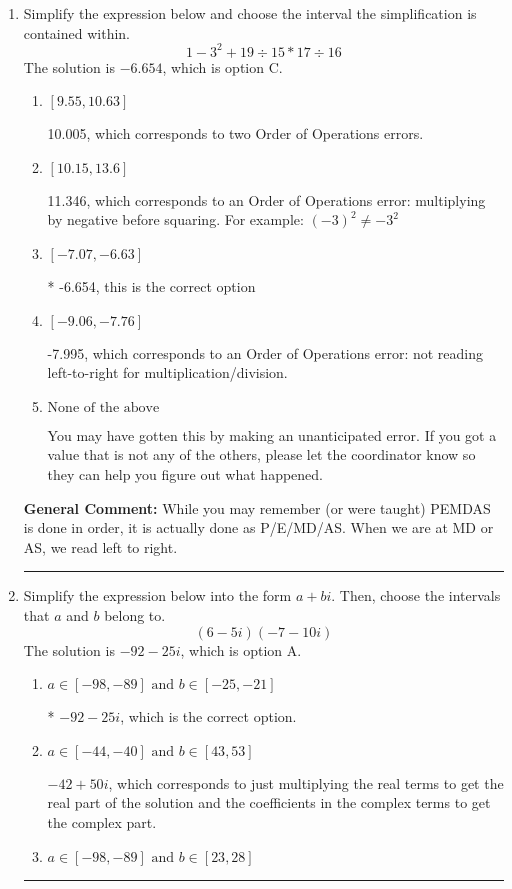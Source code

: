\documentclass{extbook}[14pt]
\newcommand{\litem}[1]{\item #1

\rule{\textwidth}{0.4pt}}
\begin{document}
\begin{enumerate}
{ Irrational numbers are more than just square root of 3: adding or subtracting values from square root of 3 is also irrational.
}
\litem{
Simplify the expression below and choose the interval the simplification is contained within.
\[ 1 - 3^2 + 19 \div 15 * 17 \div 16 \]The solution is \( -6.654 \), which is option C.\begin{enumerate}[label=\Alph*.]
\item \( [9.55, 10.63] \)

 10.005, which corresponds to two Order of Operations errors.
\item \( [10.15, 13.6] \)

 11.346, which corresponds to an Order of Operations error: multiplying by negative before squaring. For example: $(-3)^2 \neq -3^2$
\item \( [-7.07, -6.63] \)

* -6.654, this is the correct option
\item \( [-9.06, -7.76] \)

 -7.995, which corresponds to an Order of Operations error: not reading left-to-right for multiplication/division.
\item \( \text{None of the above} \)

 You may have gotten this by making an unanticipated error. If you got a value that is not any of the others, please let the coordinator know so they can help you figure out what happened.
\end{enumerate}

\textbf{General Comment:} While you may remember (or were taught) PEMDAS is done in order, it is actually done as P/E/MD/AS. When we are at MD or AS, we read left to right.
}
\litem{
Simplify the expression below into the form $a+bi$. Then, choose the intervals that $a$ and $b$ belong to.
\[ (6 - 5 i)(-7 - 10 i) \]The solution is \( -92 - 25 i \), which is option A.\begin{enumerate}[label=\Alph*.]
\item \( a \in [-98, -89] \text{ and } b \in [-25, -21] \)

* $-92 - 25 i$, which is the correct option.
\item \( a \in [-44, -40] \text{ and } b \in [43, 53] \)

 $-42 + 50 i$, which corresponds to just multiplying the real terms to get the real part of the solution and the coefficients in the complex terms to get the complex part.
\item \( a \in [-98, -89] \text{ and } b \in [23, 28] \)


\end{enumerate}}
\end{enumerate}
\end{document}
